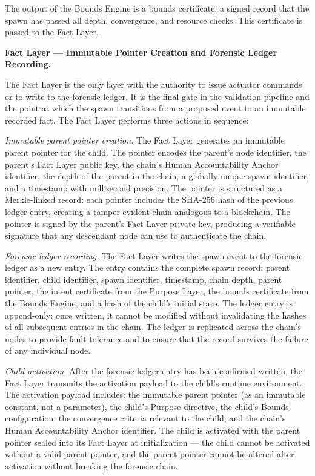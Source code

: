 The output of the Bounds Engine is a bounds certificate: a signed record that the spawn has passed all depth, convergence, and resource checks. This certificate is passed to the Fact Layer.

\bigskip

\noindent\textbf{Fact Layer — Immutable Pointer Creation and Forensic Ledger Recording.}

The Fact Layer is the only layer with the authority to issue actuator commands or to write to the forensic ledger. It is the final gate in the validation pipeline and the point at which the spawn transitions from a proposed event to an immutable recorded fact. The Fact Layer performs three actions in sequence:

\bigskip
\noindent\textit{Immutable parent pointer creation.} The Fact Layer generates an immutable parent pointer for the child. The pointer encodes the parent's node identifier, the parent's Fact Layer public key, the chain's Human Accountability Anchor identifier, the depth of the parent in the chain, a globally unique spawn identifier, and a timestamp with millisecond precision. The pointer is structured as a Merkle-linked record: each pointer includes the SHA-256 hash of the previous ledger entry, creating a tamper-evident chain analogous to a blockchain. The pointer is signed by the parent's Fact Layer private key, producing a verifiable signature that any descendant node can use to authenticate the chain.

\bigskip
\noindent\textit{Forensic ledger recording.} The Fact Layer writes the spawn event to the forensic ledger as a new entry. The entry contains the complete spawn record: parent identifier, child identifier, spawn identifier, timestamp, chain depth, parent pointer, the intent certificate from the Purpose Layer, the bounds certificate from the Bounds Engine, and a hash of the child's initial state. The ledger entry is append-only: once written, it cannot be modified without invalidating the hashes of all subsequent entries in the chain. The ledger is replicated across the chain's nodes to provide fault tolerance and to ensure that the record survives the failure of any individual node.

\bigskip
\noindent\textit{Child activation.} After the forensic ledger entry has been confirmed written, the Fact Layer transmits the activation payload to the child's runtime environment. The activation payload includes: the immutable parent pointer (as an immutable constant, not a parameter), the child's Purpose directive, the child's Bounds configuration, the convergence criteria relevant to the child, and the chain's Human Accountability Anchor identifier. The child is activated with the parent pointer sealed into its Fact Layer at initialization — the child cannot be activated without a valid parent pointer, and the parent pointer cannot be altered after activation without breaking the forensic chain.

